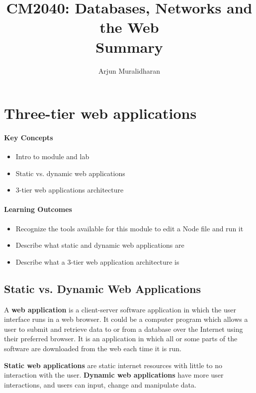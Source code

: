 \title{CM2040: Databases, Networks and the Web \\ Summary}
\author{Arjun Muralidharan}



\section{Three-tier web applications}
\begin{mdframed}

\paragraph{Key Concepts}
\begin{itemize}[label={\checkmark}]
\item Intro to module and lab
\item Static vs. dynamic web applications
\item 3-tier web applications architecture
\end{itemize}

\paragraph{Learning Outcomes}
\begin{itemize}[label={\checkmark}]
\item Recognize the tools available for this module to edit a Node file and run it
\item Describe what static and dynamic web applications are
\item Describe what a 3-tier web application architecture is
\end{itemize}
\end{mdframed}
\subsection{Static vs. Dynamic Web Applications}
A \textbf{web application} is a client-server software application in which the user interface runs in a web browser. It could be a computer program which allows a user to submit and retrieve data to or from a database over the Internet using their preferred browser. It is an application in which all or some parts of the software are downloaded from the web each time it is run.

\textbf{Static web applications} are static internet resources with little to no interaction with the user. \textbf{Dynamic web applications} have more user interactions, and users can input, change and manipulate data. 

